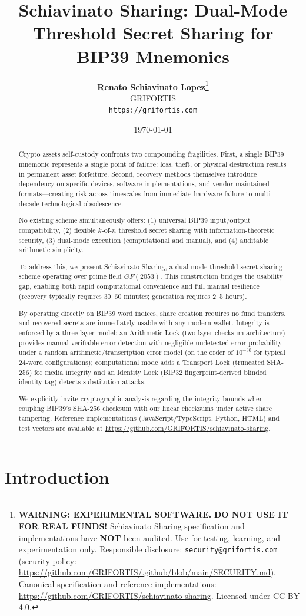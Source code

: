 \documentclass[11pt]{article}
\title{\textbf{Schiavinato Sharing: Dual-Mode Threshold Secret Sharing for BIP39 Mnemonics}}
\author{
    \textbf{Renato Schiavinato Lopez}\thanks{\textbf{WARNING: EXPERIMENTAL SOFTWARE.} \textbf{DO NOT USE IT FOR REAL FUNDS!} Schiavinato Sharing specification and implementations have \textbf{NOT} been audited. Use for testing, learning, and experimentation only. Responsible disclosure: \texttt{security@grifortis.com} (security policy: \url{https://github.com/GRIFORTIS/.github/blob/main/SECURITY.md}). Canonical specification and reference implementations: \url{https://github.com/GRIFORTIS/schiavinato-sharing}. Licensed under CC BY 4.0.} \\
    GRIFORTIS \\
    \texttt{https://grifortis.com}
}
\date{\today\\\SchiavinatoSharingVersion}
\begin{document}
\sloppy
\maketitle

\begin{abstract}
    Crypto assets self-custody confronts two compounding fragilities. First, a single BIP39 mnemonic represents a single point of failure: loss, theft, or physical destruction results in permanent asset forfeiture. Second, recovery methods themselves introduce dependency on specific devices, software implementations, and vendor-maintained formats---creating risk across timescales from immediate hardware failure to multi-decade technological obsolescence.
    
    No existing scheme simultaneously offers: (1) universal BIP39 input/output compatibility, (2) flexible $k$-of-$n$ threshold secret sharing with information-theoretic security, (3) dual-mode execution (computational and manual), and (4) auditable arithmetic simplicity.
    
    To address this, we present Schiavinato Sharing, a dual-mode threshold secret sharing scheme operating over prime field $GF(2053)$. This construction bridges the usability gap, enabling both rapid computational convenience and full manual resilience (recovery typically requires 30--60 minutes; generation requires 2--5 hours).
    
    By operating directly on BIP39 word indices, share creation requires no fund transfers, and recovered secrets are immediately usable with any modern wallet. Integrity is enforced by a three-layer model: an Arithmetic Lock (two-layer checksum architecture) provides manual-verifiable error detection with negligible undetected-error probability under a random arithmetic/transcription error model (on the order of $10^{-30}$ for typical 24-word configurations); computational mode adds a Transport Lock (truncated SHA-256) for media integrity and an Identity Lock (BIP32 fingerprint-derived blinded identity tag) detects substitution attacks.
    
    We explicitly invite cryptographic analysis regarding the integrity bounds when coupling BIP39's SHA-256 checksum with our linear checksums under active share tampering. Reference implementations (JavaScript/TypeScript, Python, HTML) and test vectors are available at \url{https://github.com/GRIFORTIS/schiavinato-sharing}.
\end{abstract}

\section{Introduction}
\end{document}
